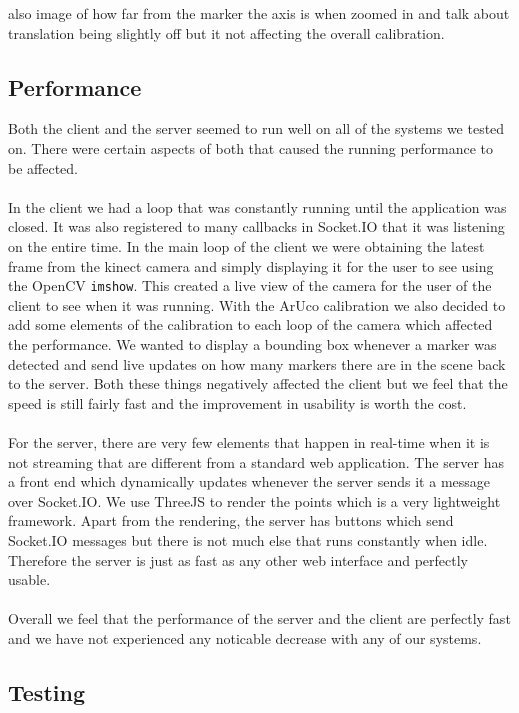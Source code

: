 \documentclass{article}
\begin{document}
also image of how far from the marker the axis is when zoomed in and talk about translation being slightly off but it not affecting the overall calibration.

\subsection{Performance}
Both the client and the server seemed to run well on all of the systems we tested on. There were certain aspects of both that caused the running performance to be affected.
\\\\
In the client we had a loop that was constantly running until the application was closed. It was also registered to many callbacks in Socket.IO that it was listening on the entire time. In the main loop of the client we were obtaining the latest frame from the kinect camera and simply displaying it for the user to see using the OpenCV \texttt{imshow}. This created a live view of the camera for the user of the client to see when it was running. With the ArUco calibration we also decided to add some elements of the calibration to each loop of the camera which affected the performance. We wanted to display a bounding box whenever a marker was detected and send live updates on how many markers there are in the scene back to the server. Both these things negatively affected the client but we feel that the speed is still fairly fast and the improvement in usability is worth the cost.
\\\\
For the server, there are very few elements that happen in real-time when it is not streaming that are different from a standard web application. The server has a front end which dynamically updates whenever the server sends it a message over Socket.IO. We use ThreeJS to render the points which is a very lightweight framework. Apart from the rendering, the server has buttons which send Socket.IO messages but there is not much else that runs constantly when idle. Therefore the server is just as fast as any other web interface and perfectly usable.
\\\\
Overall we feel that the performance of the server and the client are perfectly fast and we have not experienced any noticable decrease with any of our systems.

\subsection{Testing}
\end{document}
